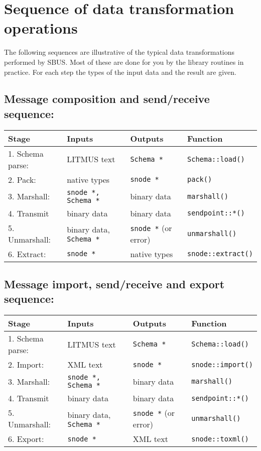 \documentclass[12pt,a4paper,twoside]{article}
\renewcommand{\_}{\texttt{\symbol{95}}}
\begin{document}
\section{Sequence of data transformation operations}

The following sequences are illustrative of the typical data
transformations performed by SBUS. Most of these are done for
you by the library routines in practice. For each step the types of
the input data and the result are given.

\subsection*{Message composition and send/receive sequence:}

\begin{tabular}{l|l|l|l}
Stage & Inputs & Outputs & Function\\
\hline
1. Schema parse: & LITMUS text & \verb^Schema *^ & \verb^Schema::load()^\\
2. Pack:         & native types & \verb^snode *^ & \verb^pack()^\\
3. Marshall:     & \verb^snode *, Schema *^ & binary data & \verb^marshall()^\\
4. Transmit      & binary data & binary data & \verb^sendpoint::*()^\\
5. Unmarshall:   & binary data, \verb^Schema *^ & \verb^snode *^ (or error) &
\verb^unmarshall()^\\
6. Extract:      & \verb^snode *^ & native types & \verb^snode::extract()^\\
\end{tabular}

\subsection*{Message import, send/receive and export sequence:}

\begin{tabular}{l|l|l|l}
Stage & Inputs & Outputs & Function\\
\hline
1. Schema parse: & LITMUS text & \verb^Schema *^ & \verb^Schema::load()^\\
2. Import:       & XML text & \verb^snode *^ & \verb^snode::import()^\\
3. Marshall:     & \verb^snode *, Schema *^ & binary data & \verb^marshall()^\\
4. Transmit      & binary data & binary data & \verb^sendpoint::*()^\\
5. Unmarshall:   & binary data, \verb^Schema *^ & \verb^snode *^ (or error) &
\verb^unmarshall()^\\
6. Export:       & \verb^snode *^ & XML text & \verb^snode::toxml()^\\
\end{tabular}
\end{document}
